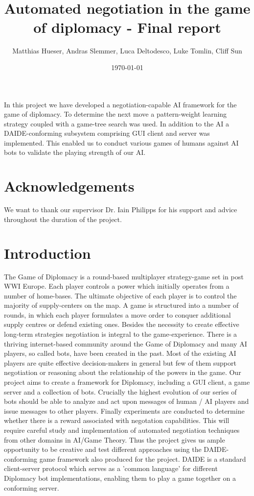 \documentclass[11pt]{article}
\title{Automated negotiation in the game of diplomacy - Final report}
\author{Matthias Hueser, Andras Slemmer, Luca Deltodesco, Luke Tomlin, Cliff Sun}
\date{\today}
\begin{document}
\maketitle

\begin{Abstract}

In this project we have developed a negotiation-capable AI framework
for the game of diplomacy. To determine the next move a pattern-weight
learning strategy coupled with a game-tree search was used. In addition
to the AI a DAIDE-conforming \cite{daidewebsite} subsystem comprising
GUI client and server was implemented. This enabled us to conduct various
games of humans against AI bots to validate the playing strength of our
AI.

\end{Abstract}

\tableofcontents

\section{Acknowledgements}

We want to thank our supervisor Dr. Iain Philipps for his support and 
advice throughout the duration of the project.

\section{Introduction}
The Game of Diplomacy is a round-based multiplayer strategy-game set in post WWI
Europe. Each player controls a power which initially operates from a number of 
home-bases. The ultimate objective of each player is to control the majority of
supply-centers on the map. A game is structured into a number of rounds, in which
each player formulates a move order to conquer additional supply centres or
defend existing ones. Besides the necessity to create effective long-term
strategies negotiation is integral to the game-experience. There is a thriving
internet-based community around the Game of Diplomacy and many AI players, so
called bots, have been created in the past. Most of the existing AI players are
quite effective decision-makers in general but few of them support negotiation
or reasoning about the relationship of the powers in the game. Our project aims
to create a framework for Diplomacy, including a GUI client, a game server and a
collection of bots. Crucially the highest evolution of our series
of bots should be able to analyze and act upon messages of human / AI players and
issue messages to other players. Finally experiments are conducted to determine whether
there is a reward associated with negotation capabilities. This will require
careful study and implementation of automated negotiation techniques from other 
domains in AI/Game Theory. Thus the project gives us ample opportunity to be
creative and test different approaches using the DAIDE-conforming game framework
also produced for the project. DAIDE is a standard client-server protocol which
serves as a 'common language' for different Diplomacy bot implementations, 
enabling them to play a game together on a conforming server.
\end{document}

